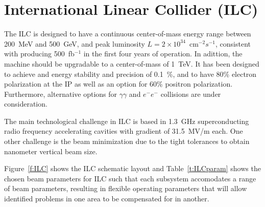 \section{International Linear Collider (ILC)}
The ILC \cite{ILCdes} is designed to have a continuous center-of-mass energy range between 200~MeV and 500~GeV, and peak luminosity $L=2\times10^{34}$~cm$^{-2}s^{-1}$, consistent with producing 500~fb$^{-1}$ in the first four years of operation. In adittion, the machine should be upgradable to a center-of-mass of 1~TeV. It has been designed to achieve and energy stability and precision of 0.1~\%, and to have 80\% electron polarization at the IP as well as an option for 60\% positron polarization. Furthermore, alternative options for $\gamma\gamma$ and $e^-e^-$ collisions are under consideration.\par
The main technological challenge in ILC is based in 1.3~GHz superconducting radio frequency accelerating cavities with gradient of 31.5~MV/m each. One other challenge is the beam minimization due to the tight tolerances to obtain nanometer vertical beam size.\par
Figure~\ref{f:ILC} shows the ILC schematic layout and Table~\ref{t:ILCparam} shows the chosen beam parameters for ILC such that each subsystem accomodates a range of beam parameters, resulting in flexible operating parameters that will allow identified problems in one area to be compensated for in another.\par

